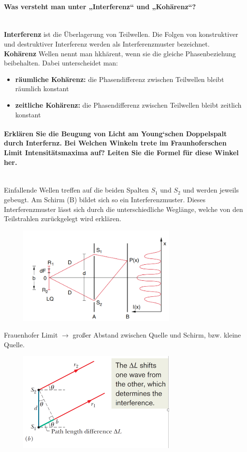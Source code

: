 \documentclass[a4paper, 11pt, parskip=half]{scrartcl}
\newcommand{\myparagraph}[1]{\paragraph{#1}\mbox{}\\}
\begin{document}
\myparagraph{Was versteht man unter „Interferenz“ und „Kohärenz“?}

\textbf{Interferenz} ist die Überlagerung von Teilwellen. Die Folgen von konstruktiver und destruktiver Interferenz werden als Interferenzmuster bezeichnet.\\
\textbf{Kohärenz} Wellen nennt man hkhärent, wenn sie die gleiche Phasenbeziehung beibehalten. Dabei unterscheidet man:
\begin{itemize}
    \item \textbf{räumliche Kohärenz: } die Phasendifferenz zwischen Teilwellen bleibt räumlich konstant
    \item \textbf{zeitliche Kohärenz: } die Phasendifferenz zwischen Teilwellen bleibt zeitlich konstant
\end{itemize}

\myparagraph{Erklären Sie die Beugung von Licht am Young‘schen Doppelspalt durch Interfernz. Bei
Welchen Winkeln trete im Fraunhoferschen Limit Intensitätsmaxima auf? Leiten Sie die
Formel für diese Winkel her.}

Einfallende Wellen treffen auf die beiden Spalten $S_1$ und $S_2$ und werden jeweils gebeugt. Am Schirm (B) bildet sich so ein Interferenzmuster. 
Dieses Interferenzmuster lässt sich durch die unterschiedliche Weglänge, welche von den Teilstrahlen zurückgelegt wird erklären.
\begin{figure}[H]
    \centering
    \includegraphics[width=8cm]{image/18_Interferenz/Youngscher Doppelspalt.png}
\end{figure}
Frauenhofer Limit $\rightarrow$ großer Abstand zwischen Quelle und Schirm, bzw. kleine Quelle.
\begin{figure}[H]
    \centering
    \includegraphics[width=8cm]{image/18_Interferenz/Doppelspalt_Wegunterschied.png}
\end{figure}
\end{document}
